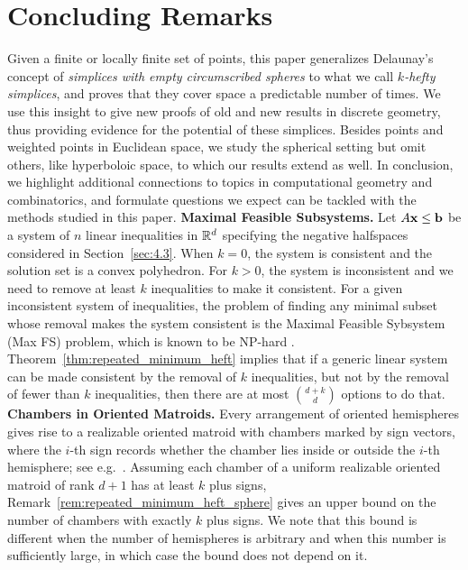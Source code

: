 \documentclass[a4paper,UKenglish,cleveref, autoref,numberwithinsect]{socg-lipics-v2021}
\newcommand {\mm}[1] {\ifmmode{#1}\else{\mbox{\(#1\)}}\fi}
\theoremstyle{plain}
\newcommand{\Rspace}        {\mm{{\mathbb R}}}
\newcommand{\bbb}           {\mm{\bf b}}
\newcommand{\xxx}           {\mm{\bf{x}}}
\begin{document}
\section{Concluding Remarks}
\label{sec:5}
Given a finite or locally finite set of points, this paper generalizes Delaunay's concept of \emph{simplices with empty circumscribed spheres} \cite{Del34} to what we call \emph{$k$-hefty simplices}, and proves that they cover space a predictable number of times.
We use this insight to give new proofs of old and new results in discrete geometry, thus providing evidence for the potential of these simplices.
Besides points and weighted points in Euclidean space, we study the spherical setting but omit others, like hyperboloic space, to which our results extend as well.
In conclusion, we highlight additional connections to topics in computational geometry and combinatorics, and formulate  questions we expect can be tackled with the methods studied in this paper.
\medskip \noindent
\textbf{Maximal Feasible Subsystems.}
%
Let $A \xxx \leq \bbb$ be a system of $n$ linear inequalities in $\Rspace^d$ specifying the negative halfspaces considered in Section~\ref{sec:4.3}.
When $k=0$, the system is consistent and the solution set is a convex polyhedron.
For $k>0$, the system is inconsistent and we need to remove at least $k$ inequalities to make it consistent.
\smallskip
For a given inconsistent system of inequalities, the problem of finding any minimal subset whose removal makes the system consistent is the Maximal Feasible Sybsystem ({\sc Max FS}) problem, which is known to be {\sc NP}-hard \cite{AK95}.
Theorem~\ref{thm:repeated_minimum_heft} implies that if a generic linear system can be made consistent by the removal of $k$ inequalities, but not by the removal of fewer than $k$ inequalities, then there are at most $\binom{d+k}{d}$ options to do that.
\medskip \noindent
\textbf{Chambers in Oriented Matroids.}
Every arrangement of oriented hemispheres gives rise to a realizable oriented matroid with chambers marked by sign vectors, where the $i$-th sign records whether the chamber lies inside or outside the $i$-th hemisphere; see e.g.\ \cite{RGZ17}.
Assuming each chamber of a uniform realizable oriented matroid of rank $d+1$ has at least $k$ plus signs, Remark~\ref{rem:repeated_minimum_heft_sphere} gives an upper bound on the number of chambers with exactly $k$ plus signs.
We note that this bound is different when the number of hemispheres is arbitrary and when this number is sufficiently large, in which case the bound does not depend on it.
\end{document}
